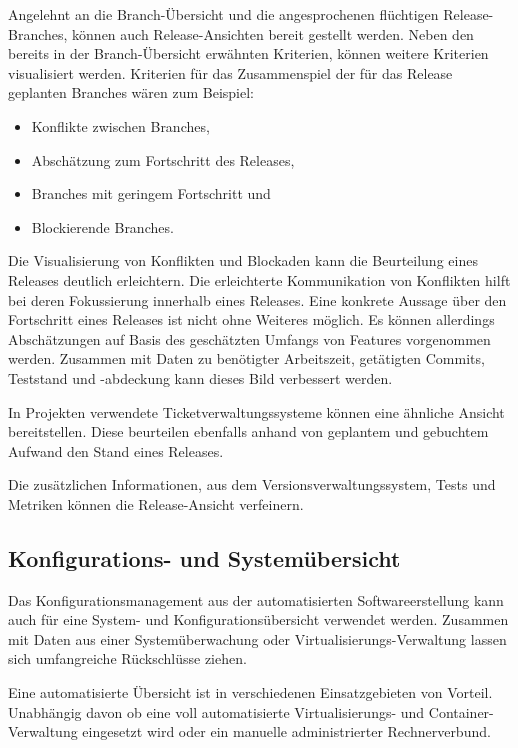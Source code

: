 Angelehnt an die Branch-Übersicht und die angesprochenen \glqq flüchtigen\grqq{} Release-Branches, können auch Release-Ansichten bereit gestellt werden. Neben den bereits in der Branch-Übersicht erwähnten Kriterien, können weitere Kriterien visualisiert werden. Kriterien für das Zusammenspiel der für das Release geplanten Branches wären zum Beispiel:
\begin{itemize}
\item Konflikte zwischen Branches,
\item Abschätzung zum Fortschritt des Releases,
\item Branches mit geringem Fortschritt und
\item Blockierende Branches.
\end{itemize}

Die Visualisierung von Konflikten und Blockaden kann die Beurteilung eines Releases deutlich erleichtern. Die erleichterte Kommunikation von Konflikten hilft bei deren Fokussierung innerhalb eines Releases. Eine konkrete Aussage über den Fortschritt eines Releases ist nicht ohne Weiteres möglich. Es können allerdings Abschätzungen auf Basis des geschätzten Umfangs von Features vorgenommen werden. Zusammen mit Daten zu benötigter Arbeitszeit, getätigten Commits, Teststand und -abdeckung kann dieses Bild verbessert werden.

In Projekten verwendete Ticketverwaltungssysteme können eine ähnliche Ansicht bereitstellen. Diese beurteilen ebenfalls anhand von geplantem und gebuchtem Aufwand den Stand eines Releases.

Die zusätzlichen Informationen, aus dem Versionsverwaltungssystem, Tests und Metriken können die Release-Ansicht verfeinern. 

\subsection{Konfigurations- und Systemübersicht}
\label{subsubsec:configuration-system-overview}

Das Konfigurationsmanagement aus der automatisierten Softwareerstellung kann auch für eine System- und Konfigurationsübersicht verwendet werden. Zusammen mit Daten aus einer Systemüberwachung oder Virtualisierungs-Verwaltung lassen sich umfangreiche Rückschlüsse ziehen. 

Eine automatisierte Übersicht ist in verschiedenen Einsatzgebieten von Vorteil. Unabhängig davon ob eine voll automatisierte Virtualisierungs- und Container-Verwaltung eingesetzt wird oder ein manuelle administrierter Rechnerverbund.


